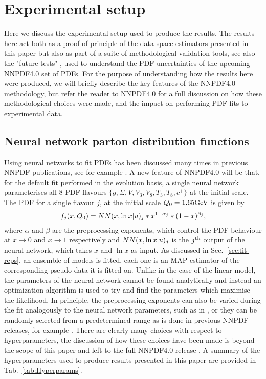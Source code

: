 \section{Experimental setup}

Here we discuss the experimental setup used to produce the results. The
results here act both as a proof of principle of the data space estimators
presented in this paper but also as part of a suite of methodological
validation tools, see also the "future tests" \cite{Cruz_Martinez_2021},
used to
understand the PDF uncertainties of the upcoming NNPDF4.0 set of PDFs.
For the purpose of understanding how the results here were produced, we
will briefly describe the key features of the NNPDF4.0 methodology,
but refer the reader to NNPDF4.0 for a full discussion on how these
methodological choices were made, and the impact on performing PDF fits
to experimental data.

\subsection{Neural network parton distribution functions}

Using neural networks to fit PDFs has been discussed many times in previous
NNPDF publications, see for example \cite{nnpdf30, Ball_2017}. A new
feature of NNPDF4.0 will be that, for the default fit performed in the
evolution basis, a
single neural network parameterises all 8 PDF flavours $\{ g, \Sigma, V, V_3, V_8, T_3, T_8, c^+ \}$
at the initial scale. The PDF for a single flavour $j$, at the initial scale
$Q_0 = 1.65 {\rm GeV}$ is given by
\begin{equation}
    f_j(x, Q_0) = NN(x, \ln x | u)_j * x^{1-\alpha_j} * (1-x)^{\beta_j},
\end{equation}
where $\alpha$ and $\beta$ are the preprocessing exponents, which control the
PDF behaviour at $x \to 0$ and $x \to 1$ respectively and
$NN(x, \ln x | u)_j$ is the
$j^{\rm th}$ output of the neural network, which takes $x$ and $\ln x$ as input.
As discussed in Sec.~\ref{sec:fit-reps}, an ensemble of models is fitted, each
one is an MAP estimator of the corresponding pseudo-data it is fitted on. Unlike
in the case of the linear model, the parameters of the neural network cannot be
found analytically and instead an optimization algorithm is used to try and
find the parameters which maximise the likelihood. In principle, the preprocessing
exponents can also be varied during the fit analogously to the neural network
parameters, such as in \cite{Carrazza_2019}, or they can be randomly selected
from a predetermined range as is done in previous NNPDF releases,
for example \cite{Ball_2017}. There are clearly many choices with respect
to hyperparameters, the discussion of how these choices have been made is
beyond the scope of this paper and left to the full NNPDF4.0 release
\cite{NNPDF40}. A summary of the hyperparameters used to produce results
presented in this paper are provided in Tab.~\ref{tab:Hyperparams}.

